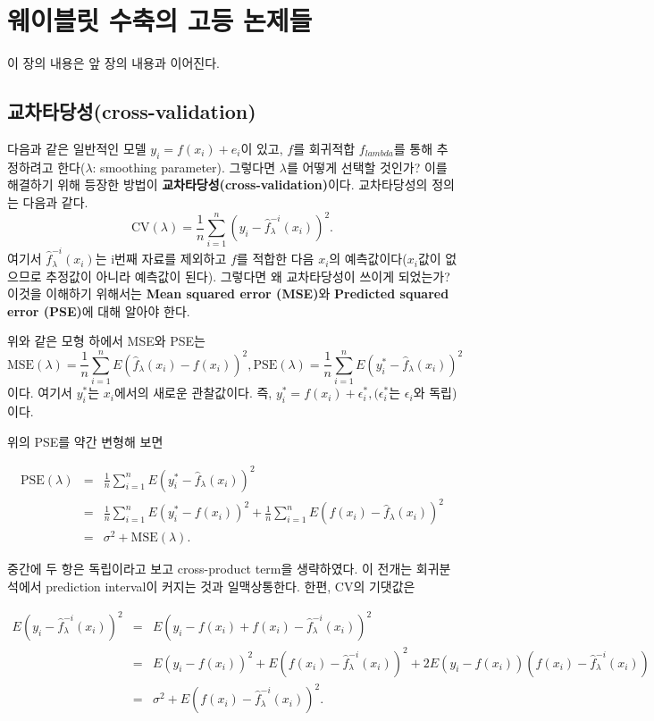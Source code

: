 \documentclass[b5paper,]{scrbook}
\theoremstyle{plain}
\theoremstyle{definition}
\numberwithin{equation}{section}
\begin{document}
\chapter{웨이블릿 수축의 고등 논제들}\label{advwaveletshrinkage}

이 장의 내용은 앞 장의 내용과 이어진다.

\section{교차타당성(cross-validation)}\label{cross-validation}

다음과 같은 일반적인 모델 \(y_{i}=f(x_{i})+e_{i}\)이 있고, \(f\)를
회귀적합 \(f_{lambda}\)를 통해 추정하려고 한다(\(\lambda\): smoothing
parameter). 그렇다면 \(\lambda\)를 어떻게 선택할 것인가? 이를 해결하기
위해 등장한 방법이 \textbf{교차타당성(cross-validation)}이다.
교차타당성의 정의는 다음과 같다.
\[\text{CV}(\lambda)=\frac{1}{n}\sum_{i=1}^{n}(y_{i}-\hat{f}_{\lambda}^{-i}(x_{i}))^{2}.\]
여기서 \(\hat{f}_{\lambda}^{-i}(x_{i})\)는 i번째 자료를 제외하고 \(f\)를
적합한 다음 \(x_{i}\)의 예측값이다(\(x_{i}\)값이 없으므로 추정값이
아니라 예측값이 된다). 그렇다면 왜 교차타당성이 쓰이게 되었는가? 이것을
이해하기 위해서는 \textbf{Mean squared error (MSE)}와 \textbf{Predicted
squared error (PSE)}에 대해 알아야 한다.

위와 같은 모형 하에서 MSE와 PSE는
\[\text{MSE}(\lambda)=\frac{1}{n}\sum_{i=1}^{n}E(\hat{f}_{\lambda}(x_{i})-f(x_{i}))^{2}, \text{PSE}(\lambda)=\frac{1}{n}\sum_{i=1}^{n}E(y_{i}^{*}-\hat{f}_{\lambda}(x_{i}))^{2}\]
이다. 여기서 \(y_{i}^{*}\)는 \(x_{i}\)에서의 새로운 관찰값이다. 즉,
\(y_{i}^{*}=f(x_{i})+\epsilon_{i}^{*}, (\epsilon_{i}^{*}\)는
\(\epsilon_{i}\)와 독립)이다.

위의 PSE를 약간 변형해 보면

\begin{eqnarray*}
\text{PSE}(\lambda)&=&\frac{1}{n}\sum_{i=1}^{n}E(y_{i}^{*}-\hat{f}_{\lambda}(x_{i}))^{2}\\
&=&\frac{1}{n}\sum_{i=1}^{n}E(y_{i}^{*}-f(x_{i}))^{2}+\frac{1}{n}\sum_{i=1}^{n}E(f(x_{i})-\hat{f}_{\lambda}(x_{i}))^{2}\\
&=&\sigma^{2}+\text{MSE}(\lambda).
\end{eqnarray*}

중간에 두 항은 독립이라고 보고 cross-product term을 생략하였다. 이
전개는 회귀분석에서 prediction interval이 커지는 것과 일맥상통한다.
한편, CV의 기댓값은

\begin{eqnarray*}
E(y_{i}-\hat{f}_{\lambda}^{-i}(x_{i}))^{2}&=&E(y_{i}-f(x_{i})+f(x_{i})-\hat{f}_{\lambda}^{-i}(x_{i}))^{2}\\
&=&E(y_{i}-f(x_{i}))^{2}+E(f(x_{i})-\hat{f}_{\lambda}^{-i}(x_{i}))^{2}+2E(y_{i}-f(x_{i}))(f(x_{i})-\hat{f}_{\lambda}^{-i}(x_{i}))\\
&=&\sigma^{2}+E(f(x_{i})-\hat{f}_{\lambda}^{-i}(x_{i}))^{2}.\\
\end{eqnarray*}
\end{document}
